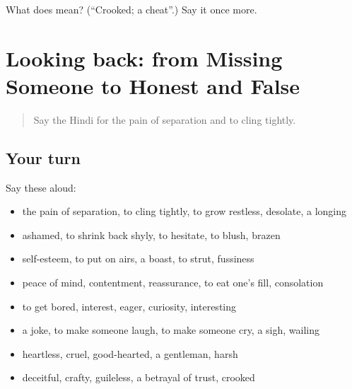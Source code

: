 \begin{tcolorbox}[breakable,colback=teal!4,colframe=teal!35!black,title={Before you move on}]
What does  mean? (\textquotedblleft{}Crooked; a cheat\textquotedblright{}.) Say it once more.
\end{tcolorbox}
\section[(dialogue)]{Looking back: from Missing Someone to Honest and False}

\label{lesson:HI-R467-review-460-467}



\begin{quote}
Say the Hindi for the pain of separation and to cling tightly.
\end{quote}

\subsection*{Your turn}
Say these aloud:

\begin{itemize}
\raggedright
  \item the pain of separation, to cling tightly, to grow restless, desolate, a longing
  \item ashamed, to shrink back shyly, to hesitate, to blush, brazen
  \item self-esteem, to put on airs, a boast, to strut, fussiness
  \item peace of mind, contentment, reassurance, to eat one's fill, consolation
  \item to get bored, interest, eager, curiosity, interesting
  \item a joke, to make someone laugh, to make someone cry, a sigh, wailing
  \item heartless, cruel, good-hearted, a gentleman, harsh
  \item deceitful, crafty, guileless, a betrayal of trust, crooked
\end{itemize}

